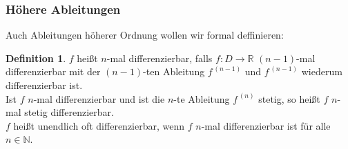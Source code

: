 \documentclass[fontsize=12pt,paper=a4,twoside,bibtotoc,idxtotoc,
liststotoc,pagesize,BCOR1.2cm,DIV15,chapterprefix,pagesize=pdftex]{scrbook}
\theoremstyle{plain}
\theoremstyle{definition}
\newtheorem{df}[equation]{Definition}
\theoremstyle{remark}
\begin{document}
\subsubsection{Höhere Ableitungen}
Auch Ableitungen höherer Ordnung wollen wir formal deffinieren:
\begin{df}
 $f$ heißt $n$-mal differenzierbar, falls $f:D
\rightarrow \mathbb{R}$ $(n-1)$-mal differenzierbar mit der
$(n-1)$-ten Ableitung $f^{\,(n-1)}$ und $f^{\,(n-1)}$ wiederum
differenzierbar ist.\\
Ist $f$ $n$-mal differenzierbar und ist die $n$-te Ableitung $f^{\,(n)}$
stetig, so heißt $f$ $n$-mal stetig differenzierbar.\\
$f$ heißt unendlich oft differenzierbar, wenn $f$ $n$-mal
differenzierbar ist für alle $n\in \mathbb{N}$. 
\end{df}
\end{document}
